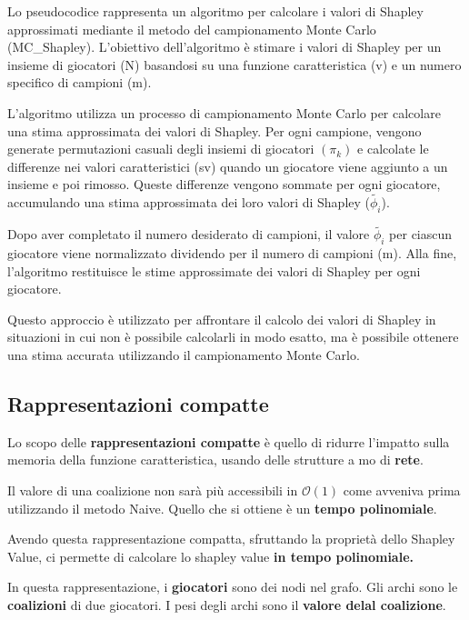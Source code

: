 Lo pseudocodice rappresenta un algoritmo per calcolare i valori di Shapley
approssimati mediante il metodo del campionamento Monte Carlo (MC\_Shapley).
L'obiettivo dell'algoritmo è stimare i valori di Shapley per un insieme di
giocatori (N) basandosi su una funzione caratteristica (v) e un numero
specifico di campioni (m).

L'algoritmo utilizza un processo di campionamento Monte Carlo per calcolare una
stima approssimata dei valori di Shapley. Per ogni campione, vengono generate
permutazioni casuali degli insiemi di giocatori $(\pi_k)$ e calcolate le
differenze nei valori caratteristici (sv) quando un giocatore viene aggiunto a
un insieme e poi rimosso. Queste differenze vengono sommate per ogni giocatore,
accumulando una stima approssimata dei loro valori di Shapley
($\widetilde{\phi_i}$).

Dopo aver completato il numero desiderato di campioni, il valore
$\widetilde{\phi_i}$ per ciascun giocatore viene normalizzato dividendo per il
numero di campioni (m). Alla fine, l'algoritmo restituisce le stime
approssimate dei valori di Shapley per ogni giocatore.

Questo approccio è utilizzato per affrontare il calcolo dei valori di Shapley
in situazioni in cui non è possibile calcolarli in modo esatto, ma è possibile
ottenere una stima accurata utilizzando il campionamento Monte Carlo.

\subsection{Rappresentazioni compatte}

Lo scopo delle \textbf{rappresentazioni compatte} è quello di ridurre l'impatto
sulla memoria della funzione caratteristica, usando delle strutture a mo di
\textbf{rete}.

Il valore di una coalizione non sarà più accessibili in $\mathcal{O}(1)$ come
avveniva prima utilizzando il metodo Naive. Quello che si ottiene è un
\textbf{tempo polinomiale}.

Avendo questa rappresentazione compatta, sfruttando la proprietà dello Shapley
Value, ci permette di calcolare lo shapley value \textbf{in tempo polinomiale.}

\begin{definition}
\end{definition}

In questa rappresentazione, i \textbf{giocatori} sono dei nodi nel grafo. Gli
archi sono le \textbf{coalizioni} di due giocatori. I pesi degli archi sono il
\textbf{valore delal coalizione}.

